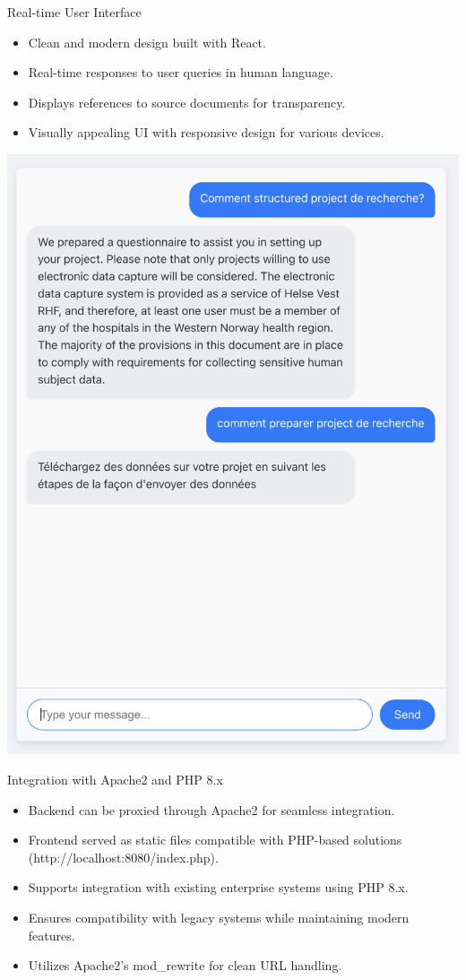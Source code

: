 \documentclass{beamer}
\begin{document}
\begin{frame}{Real-time User Interface}
    \begin{itemize}
        \item Clean and modern design built with React.
        \item Real-time responses to user queries in human language.
        \item Displays references to source documents for transparency.
        \item Visually appealing UI with responsive design for various devices.
    \end{itemize}
     \includegraphics[width=\textwidth]{ui-screenshot.png} %
\end{frame}

\begin{frame}{Integration with Apache2 and PHP 8.x}
    \begin{itemize}
        \item Backend can be proxied through Apache2 for seamless integration.
        \item Frontend served as static files compatible with PHP-based solutions (http://localhost:8080/index.php).
        \item Supports integration with existing enterprise systems using PHP 8.x.
        \item Ensures compatibility with legacy systems while maintaining modern features.
        \item Utilizes Apache2's mod_rewrite for clean URL handling.
    \end{itemize}
\end{frame}
\end{document}
